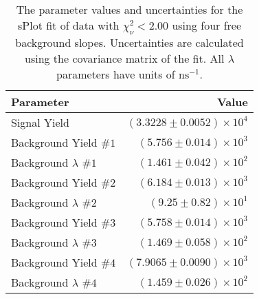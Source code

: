 
\begin{table}[ht]
    \begin{center}
        \begin{tabular}{lr}\toprule
            Parameter & Value \\\midrule
            Signal Yield & $(3.3228 \pm 0.0052) \times 10^{4}$ \\
            Background Yield $\#1$ & $(5.756 \pm 0.014) \times 10^{3}$ \\
            Background $\lambda$ $\#1$ & $(1.461 \pm 0.042) \times 10^{2}$ \\
            Background Yield $\#2$ & $(6.184 \pm 0.013) \times 10^{3}$ \\
            Background $\lambda$ $\#2$ & $(9.25 \pm 0.82) \times 10^{1}$ \\
            Background Yield $\#3$ & $(5.758 \pm 0.014) \times 10^{3}$ \\
            Background $\lambda$ $\#3$ & $(1.469 \pm 0.058) \times 10^{2}$ \\
            Background Yield $\#4$ & $(7.9065 \pm 0.0090) \times 10^{3}$ \\
            Background $\lambda$ $\#4$ & $(1.459 \pm 0.026) \times 10^{2}$ \\\bottomrule
        \end{tabular}
        \caption{The parameter values and uncertainties for the sPlot fit of data with $\chi^2_\nu < 2.00$ using four free background slopes. Uncertainties are calculated using the covariance matrix of the fit. All $\lambda$ parameters have units of $\si{\nano\second}^{-1}$.}\label{tab:splot-fit-results-chisqdof-2.00-free-4}
    \end{center}
\end{table}
